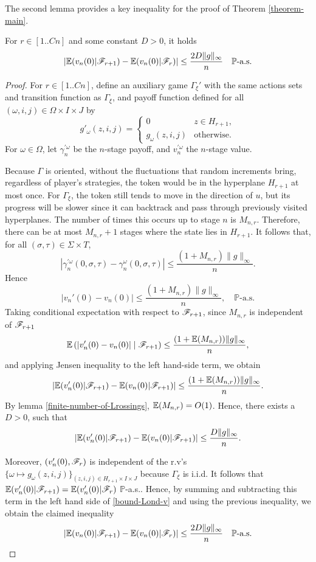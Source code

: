 	The second lemma provides a key inequality for the proof of Theorem \ref{theorem-main}.

		\begin{lemma} \label{lemma2}
			For $r \in [1..Cn]$ and some constant $D > 0$, it holds
			\begin{equation}\label{bound-Lond-v}
				|\mathbb{E} (v_n(0)|\mathscr{F}_{r+1}) - \mathbb{E} (v_n(0)|\mathscr{F}_r)| \leq \frac{2D\|g\|_{\infty}}{n} \quad \mathbb{P}\text{-a.s.}
			\end{equation}
		\end{lemma}
	\begin{proof}
	For $r \in [1..Cn]$, define an auxiliary game $\Gamma_{\xi}'$ with the same actions sets and transition function as $\Gamma_{\xi}$, and payoff function defined for all $(\omega, i, j) \in \Omega \times I \times J$ by
	\[
		g'_{\omega}(z, i, j) = \begin{cases}
								0				   &	 z \in H_{r+1},\\
								g_{\omega}(z, i, j) & \text{otherwise} .
							  \end{cases}
	\]
	For $\omega \in \Omega$, let $\gamma_n^{'\omega}$ be the $n$-stage payoff, and $v_n^{'\omega}$ the $n$-stage value. 
	
	Because $\Gamma$ is oriented, without the fluctuations that random increments bring, regardless of player's strategies, the token would be  in the hyperplane $H_{r+1}$ at most once. For $\Gamma_{\xi}$, the token still tends to move in the direction of $u$, but its progress will be slower since it can backtrack and pass through previously visited hyperplanes. The number of times this occurs up to stage $n$ is $M_{n, r}$. Therefore, there can be at most $M_{n, r} + 1$ stages where the state lies in $H_{r+1}$. It follows that, for all $(\sigma, \tau) \in \Sigma \times T$,
	\[
		|\gamma_n^{'\omega}(0, \sigma, \tau) - \gamma_n^{\omega}(0, \sigma, \tau)| \leq \frac{(1+M_{n, r})\|g\|_{\infty}}{n}. 
	\]
	Hence
	\[
		|v_n'(0) - v_n(0)| \leq \frac{(1 + M_{n, r})\|g\|_{\infty}}{n}, \quad \mathbb{P}\text{-a.s.}
	\]
	Taking conditional expectation with respect to $\mathscr{F}_{r+1}$, since $M_{n, r}$ is independent of $\mathscr{F}_{r+1}$ 
	\[
		\mathbb{E}\left(|v_n'(0) - v_n(0)|\mid \mathscr{F}_{r+1}\right) \leq \frac{(1 + \mathbb{E}(M_{n, r}))\|g\|_{\infty}}{n},
	\]
	and applying Jensen inequality to the left hand-side term, we obtain
	\[
		|\mathbb{E}(v_n'(0)|\mathscr{F}_{r+1}) - \mathbb{E}(v_n(0)|\mathscr{F}_{r+1})| \leq \frac{(1 + \mathbb{E}(M_{n, r}))\|g\|_{\infty}}{n}.
	\]
	By lemma \ref{finite-number-of-Lrossings}, $\mathbb{E}(M_{n, r}) = O(1)$. Hence, there exists a $D > 0$, such that
	\[
		|\mathbb{E}(v_n'(0)|\mathscr{F}_{r+1}) - \mathbb{E}(v_n(0)|\mathscr{F}_{r+1})| \leq \frac{D\|g\|_{\infty}}{n}.
	\]

	Moreover, $(v_n'(0), \mathscr{F}_r)$ is independent of the r.v's $\{\omega \mapsto g_{\omega}(z, i, j)\}_{(z, i, j) \in H_{r+1} \times I \times J}$ because $\Gamma_{\xi}$ is i.i.d. It follows that $\mathbb{E}(v_n'(0)|\mathscr{F}_{r+1}) = \mathbb{E}(v_n'(0)|\mathscr{F}_{r})$ $\mathbb{P}$-a.s.. Hence, by summing and subtracting this term in the left hand side of \eqref{bound-Lond-v} and using the previous inequality, we obtain the claimed inequality
	\[
		|\mathbb{E} (v_n(0)|\mathscr{F}_{r+1}) - \mathbb{E} (v_n(0)|\mathscr{F}_r)| \leq \frac{2D\|g\|_{\infty}}{n} \quad \mathbb{P}\text{-a.s.}
	\] 
	\end{proof}

